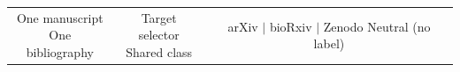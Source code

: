 \setlength{\fboxsep}{7pt}%
\begin{tabular}{c@{\quad$\longrightarrow$\quad}c@{\quad$\longrightarrow$\quad}c}
  \fbox{\parbox[c][1.35cm][c]{0.19\textwidth}{\centering
    One manuscript\\One bibliography}}
  &
  \fbox{\parbox[c][1.35cm][c]{0.19\textwidth}{\centering
    Target selector\\Shared class}}
  &
  \fbox{\parbox[c][1.35cm][c]{0.27\textwidth}{\centering
    arXiv $\vert$ bioRxiv $\vert$ Zenodo\\Neutral (no label)}}
\end{tabular}
